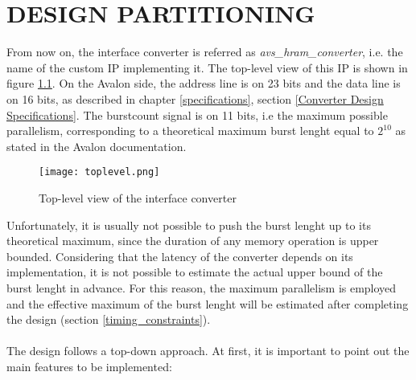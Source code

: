 \documentclass[10pt, english, a4paper, titlepage, oneside]{book}
\begin{document}
\chapter{DESIGN PARTITIONING}
\noindent From now on, the interface converter is referred as \textit{avs\_hram\_converter}, i.e. the name of the custom IP implementing it. The top-level view of this IP is shown in figure \ref{toplevel}. On the Avalon side, the address line is on 23 bits and the data line is on 16 bits, as described in chapter \ref{specifications}, section \ref{Converter Design Specifications}. The burstcount signal is on 11 bits, i.e the maximum possible parallelism, corresponding to a theoretical maximum burst lenght equal to $2^{10}$ as stated in the Avalon documentation. 
\vspace{4mm}
\begin{figure}[H]
    \centering
    \texttt{[image: toplevel.png]}
    \vspace{3mm}
    \caption{Top-level view of the interface converter}
    \label{toplevel}
\end{figure}
\vspace{4mm}
\noindent Unfortunately, it is usually not possible to push the burst lenght up to its theoretical maximum, since the duration of any memory operation is upper bounded. Considering that the latency of the converter depends on its implementation, it is not possible to estimate the actual upper bound of the burst lenght in advance. For this reason, the maximum parallelism is employed and the effective maximum of the burst lenght will be estimated after completing the design (section \ref{timing_constraints}).
\\ \\
\noindent The design follows a top-down approach. At first, it is important to point out the main features to be implemented:
\vspace{2mm}
\end{document}
